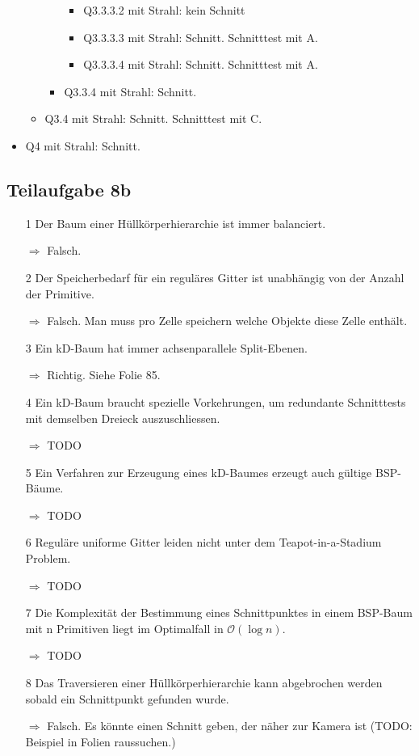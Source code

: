 \documentclass[a4paper]{scrartcl}
\begin{document}
\begin{itemize}
\begin{itemize}
\begin{itemize}
\begin{itemize}
                \item Q3.3.3.2 mit Strahl: kein Schnitt
                \item Q3.3.3.3 mit Strahl: Schnitt. Schnitttest mit A.
                \item Q3.3.3.4 mit Strahl: Schnitt. Schnitttest mit A.
            \end{itemize}
            \item Q3.3.4 mit Strahl: Schnitt.
        \end{itemize}
        \item Q3.4 mit Strahl: Schnitt. Schnitttest mit C.
    \end{itemize}
    \item Q4 mit Strahl: Schnitt.
\end{itemize}

\subsection*{Teilaufgabe 8b}
\begin{itemize}
    \item[1] Der Baum einer Hüllkörperhierarchie ist immer balanciert.
    \item[$\Rightarrow$] Falsch.
    \item[2] Der Speicherbedarf für ein reguläres Gitter ist unabhängig von der Anzahl der Primitive.
    \item[$\Rightarrow$] Falsch. Man muss pro Zelle speichern welche Objekte diese Zelle enthält.
    \item[3] Ein kD-Baum hat immer achsenparallele Split-Ebenen.
    \item[$\Rightarrow$] Richtig. Siehe Folie 85.
    \item[4] Ein kD-Baum braucht spezielle Vorkehrungen, um redundante Schnitttests mit demselben Dreieck auszuschliessen.
    \item[$\Rightarrow$] TODO
    \item[5] Ein Verfahren zur Erzeugung eines kD-Baumes erzeugt auch gültige BSP-Bäume.
    \item[$\Rightarrow$] TODO
    \item[6] Reguläre uniforme Gitter leiden nicht unter dem Teapot-in-a-Stadium Problem.
    \item[$\Rightarrow$] TODO
    \item[7] Die Komplexität der Bestimmung eines Schnittpunktes in einem BSP-Baum mit n Primitiven liegt im Optimalfall in $\mathcal{O}(\log n)$.
    \item[$\Rightarrow$] TODO
    \item[8] Das Traversieren einer Hüllkörperhierarchie kann abgebrochen werden sobald ein Schnittpunkt gefunden wurde.
    \item[$\Rightarrow$] Falsch. Es könnte einen Schnitt geben, der näher zur Kamera ist (TODO: Beispiel in Folien raussuchen.)
\end{itemize}
\end{document}
